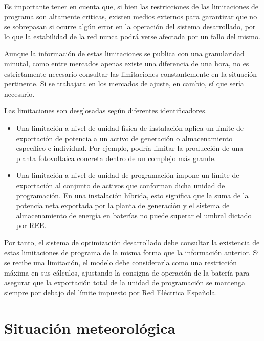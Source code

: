 Es importante tener en cuenta que, si bien las restricciones de las limitaciones de programa son altamente criticas, existen medios externos para garantizar que no se sobrepasan si ocurre algún error en la operación del sistema desarrollado, por lo que la estabilidad de la red nunca podrá verse afectada por un fallo del mismo.

Aunque la información de estas limitaciones se publica con una granularidad minutal, como entre mercados apenas existe una diferencia de una hora, no es estrictamente necesario consultar las limitaciones constantemente en la situación pertinente. Si se trabajara en los mercados de ajuste, en cambio, sí que sería necesario.

Las limitaciones son desglosadas según diferentes identificadores.

\begin{itemize}

  \item Una limitación a nivel de unidad física de instalación aplica un límite de exportación de potencia a un activo de generación o almacenamiento específico e individual. Por ejemplo, podría limitar la producción de una planta fotovoltaica concreta dentro de un complejo más grande.

  \item Una limitación a nivel de unidad de programación impone un límite de exportación al conjunto de activos que conforman dicha unidad de programación. En una instalación híbrida, esto significa que la suma de la potencia neta exportada por la planta de generación y el sistema de almacenamiento de energía en baterías no puede superar el umbral dictado por REE.

\end{itemize}

Por tanto, el sistema de optimización desarrollado debe consultar la existencia de estas limitaciones de programa de la misma forma que la información anterior. Si se recibe una limitación, el modelo debe considerarla como una restricción máxima en sus cálculos, ajustando la consigna de operación de la batería para asegurar que la exportación total de la unidad de programación se mantenga siempre por debajo del límite impuesto por Red Eléctrica Española.

\section{Situación meteorológica}
\label{makereference4.3}

